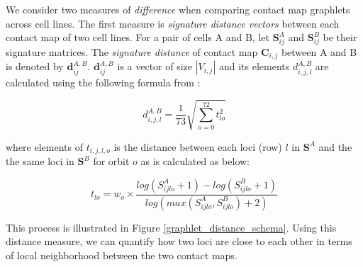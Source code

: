 \documentclass[a4,center,fleqn]{NAR}
\begin{document}

We consider two measures of \textit{difference} when comparing contact
map graphlets across cell lines. 
The first measure is \textit{signature distance vectors} between
each contact map of two cell lines. 
For a pair of cells A and B, let 
$\mathbf{S}^A_{ij}$  and $\mathbf{S}^B_{ij}$ be their
signature matrices. The \textit{signature distance} of
contact map $\mathbf{C}_{i,j}$ between A and B is denoted
by $\mathbf{d}^{A,B}_{ij}$. $\mathbf{d}^{A,B}_{ij}$ 
is a vector of size $|V_{i,j}|$
and its elements $d^{A,B}_{i,j,l}$ are
calculated using the following formula from \cite{prvzulj2007biological}:

\begin{equation}
    d^{A,B}_{i,j,l} = 
    \frac{1}{73}\sqrt{\sum_{o=0}^{72}{t_{lo}^2}}
    \label{eq:distance_total}
\end{equation}

where elements of $t_{i,j,l,o}$ is the
distance between each
loci (row) $l$ in $\mathbf{S}^A$ and the the same loci in 
$\mathbf{S}^B$ for
orbit $o$ as is calculated as below:

\begin{equation}
    t_{lo} = w_o \times 
    \frac{log(S_{ijlo}^A+1) - log(S_{ijlo}^B+1)}
    {log(max(S_{ijlo}^A, S_{ijlo}^B) + 2)}
    \label{eq:distance_single}
\end{equation}


This process is illustrated in Figure \ref{graphlet_distance_schema}.
Using this distance measure, we can quantify how two loci are close to
each other in terms of local neighborhood between the two contact maps.
\end{document}
